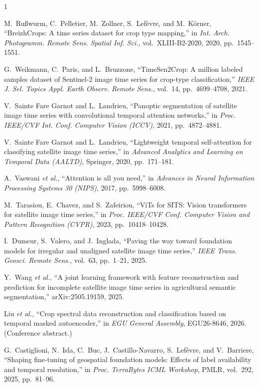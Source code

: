 \documentclass[journal]{IEEEtran}
\begin{document}
\begin{thebibliography}{1}

M.~Ru{\ss}wurm, C.~Pelletier, M.~Zollner, S.~Lef\`evre, and M.~K\"orner,
``BreizhCrops: A time series dataset for crop type mapping,'' in
\emph{Int. Arch. Photogramm. Remote Sens. Spatial Inf. Sci.},
vol.~XLIII-B2-2020, 2020, pp.~1545--1551.

G.~Weikmann, C.~Paris, and L.~Bruzzone, ``TimeSen2Crop: A million labeled
samples dataset of Sentinel-2 image time series for crop-type classification,''
\emph{IEEE J. Sel. Topics Appl. Earth Observ. Remote Sens.}, vol.~14,
pp.~4699--4708, 2021.

V.~Sainte Fare Garnot and L.~Landrieu, ``Panoptic segmentation of satellite
image time series with convolutional temporal attention networks,'' in
\emph{Proc. IEEE/CVF Int. Conf. Computer Vision (ICCV)}, 2021,
pp.~4872--4881.

V.~Sainte Fare Garnot and L.~Landrieu, ``Lightweight temporal self-attention
for classifying satellite image time series,'' in \emph{Advanced Analytics and
Learning on Temporal Data (AALTD)}, Springer, 2020, pp.~171--181.

A.~Vaswani \emph{et al.}, ``Attention is all you need,'' in \emph{Advances in
Neural Information Processing Systems 30 (NIPS)}, 2017, pp.~5998--6008.

M.~Tarasiou, E.~Chavez, and S.~Zafeiriou, ``ViTs for SITS: Vision transformers
for satellite image time series,'' in \emph{Proc. IEEE/CVF Conf. Computer
Vision and Pattern Recognition (CVPR)}, 2023, pp.~10418--10428.

I.~Dumeur, S.~Valero, and J.~Inglada, ``Paving the way toward foundation
models for irregular and unaligned satellite image time series,'' \emph{IEEE
Trans. Geosci. Remote Sens.}, vol.~63, pp.~1--21, 2025.

Y.~Wang \emph{et al.}, ``A joint learning framework with feature
reconstruction and prediction for incomplete satellite image time series in
agricultural semantic segmentation,'' arXiv:2505.19159, 2025.

Liu \emph{et al.}, ``Crop spectral data reconstruction and classification based
on temporal masked autoencoder,'' in \emph{EGU General Assembly}, EGU26-8646,
2026. (Conference abstract.)

G.~Castiglioni, N.~Isla, C.~Buc, J.~Castillo-Navarro, S.~Lef\`evre, and
V.~Barriere, ``Shaping fine-tuning of geospatial foundation models: Effects of
label availability and temporal resolution,'' in \emph{Proc. TerraBytes ICML
Workshop}, PMLR, vol.~292, 2025, pp.~81--96.


\end{thebibliography}
\end{document}
